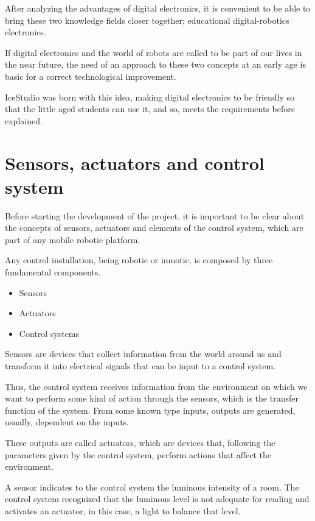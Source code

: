 After analyzing the advantages of digital electronics, it is convenient to be able to bring these two knowledge fields closer together; educational digital-robotics electronics.\newline

If digital electronics and the world of robots are called to be part of our lives in the near future, the need of an approach to these two concepts at an early age is basic for a correct technological improvement. \newline

IceStudio was born with this idea, making digital electronics to be friendly so that the little aged students can use it, and so, meets the requirements before explained.

\section{Sensors, actuators and control system}

Before starting the development of the project, it is important to be clear about the concepts of sensors, actuators and elements of the control system, which are part of any mobile robotic platform.\newline

Any control installation, being robotic or imnotic, is composed by three fundamental components.
\begin{itemize}
	\item Sensors
	\item Actuators
	\item Control systems
\end{itemize}

Sensors are devices that collect information from the world around us and transform it into electrical signals that can be input to a control system. \newline

Thus, the control system receives information from the environment on which we want to perform some kind of action through the sensors, which is the transfer function of the system. From some known type inputs, outputs are generated, usually, dependent on the inputs.\newline

These outputs are called actuators, which are devices that, following the parameters given by the control system, perform actions that affect the environment. \newline

\begin{ejemplo}
A sensor indicates to the control system the luminous intensity of a room. The control system recognized that the luminous level is not adequate for reading and activates an actuator, in this case, a light to balance that level.
\end{ejemplo}

